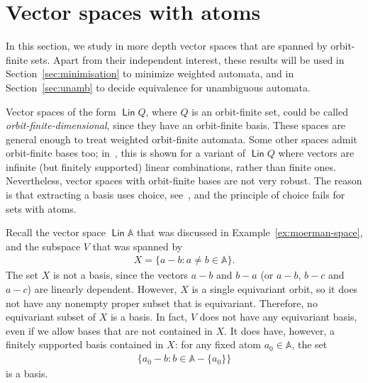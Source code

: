 \documentclass[10pt,a4paper]{amsart}
\numberwithin{equation}{section}
\newcommand{\set}[1]{\{#1\}}
\newcommand{\atoms}{\mathbb A}
\DeclareMathOperator{\lin}{\mathsf{Lin}}
\begin{document}
\section{Vector spaces with atoms}
\label{sec:vector-spaces}
In this section, we study in more depth vector spaces that are spanned by orbit-finite sets.  Apart from their independent interest, these results will be used in Section~\ref{sec:minimisation} to minimize weighted automata, and in Section~\ref{sec:unamb} to decide equivalence for unambiguous automata.

Vector spaces of the form $\lin Q$, where $Q$ is an orbit-finite set, could be called {\em orbit-finite-dimensional}, since they have an orbit-finite basis. These spaces are general enough to treat weighted orbit-finite automata. Some other spaces admit orbit-finite bases too; in~\cite[Thm.~3.3]{GHL22}, this is shown for a variant of $\lin Q$ where vectors are infinite (but finitely supported) linear combinations, rather than finite ones. Nevertheless, vector spaces with orbit-finite bases are not very robust.  The reason is that extracting a basis uses choice, see~\cite[Thm.~1]{blassbases}, and the principle of choice fails for sets with atoms.





\begin{example}
    \label{ex:no-equivariant-basis}
    Recall the vector space  $\lin \atoms$ that was discussed in Example~\ref{ex:moerman-space}, and the subspace $V$ that was spanned by
    \begin{align*}
        X = \set{a-b : a \neq b \in \atoms}.
    \end{align*}
    The set $X$ is not a basis, since the vectors $a-b$ and $b-a$ (or $a-b$, $b-c$ and $a-c$) are linearly dependent. However, $X$ is a single equivariant orbit, so it does not have any nonempty proper subset that is equivariant. Therefore, no equivariant subset of $X$ is a basis. In fact, $V$ does not have any equivariant basis, even if we allow bases that are not contained in $X$. It does have, however, a finitely supported basis contained in $X$: for any fixed atom $a_0 \in \atoms$, the set
    \begin{align*}
     \set{a_0 - b : b \in \atoms - \set {a_0} }
    \end{align*} 
    is a basis.
\end{example}
\end{document}
